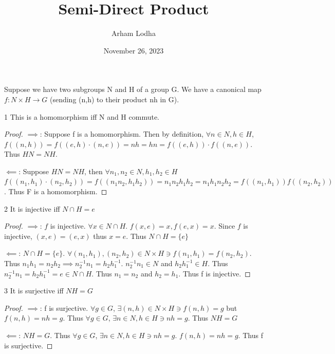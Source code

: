 \documentclass{article}
\begin{document}
\title{Semi-Direct Product}
\author{Arham Lodha}%
\date{November 26, 2023}%
\maketitle


Suppose we have two subgroups N and H of a group G. We have a canonical map $f: N \times H \to G$ (sending (n,h) to their product nh in G). 

\begin{PROB}{1}\label{Problem 1.}
    This is a homomorphism iff N and H commute. 
\end{PROB}
\begin{proof}
    $\implies$: Suppose f is a homomorphism. Then by definition, $\forall n \in N, h \in H$, $f((n, h)) = f((e, h) \cdot (n, e)) = nh = hn = f((e, h)) \cdot f((n, e))$. Thus $HN = NH$.

    $\impliedby$: Suppose $HN = NH$, then $\forall n_1, n_2 \in N, h_1, h_2 \in H$ $f((n_1, h_1) \cdot (n_2, h_2)) = f((n_1n_2, h_1h_2)) = n_1n_2h_1h_2 = n_1h_1n_2h_2 = f((n_1, h_1))f((n_2, h_2))$. Thus F is a homomorphism.
\end{proof}

\bigskip

\begin{PROB}{2}\label{Problem 2.}
    It is injective iff $N \cap H = {e}$
\end{PROB}
\begin{proof}
    $\implies$: $f$ is injective. $\forall x \in N \cap H$. $f(x, e) = x, f(e, x) = x$. Since $f$ is injective, $(x, e) = (e, x)$ thus $x = e$. Thus $N \cap H = \{e\}$

    $\impliedby$: $N \cap H = \{e\}$. $\forall (n_1, h_1), (n_2, h_2) \in N \times H \ni f(n_1, h_1) = f(n_2, h_2)$. Thus $n_1h_1 = n_2h_2 \implies n_2^{-1}n_1 = h_2h_1^{-1}$. $n_2^{-1}n_1 \in N$ and $h_2h_1^{-1} \in H$. Thus $n_2^{-1}n_1 = h_2h_1^{-1} = e \in N \cap H$. Thus $n_1 = n_2$ and $h_2 = h_1$. Thus f is injective.
\end{proof}

\bigskip

\begin{PROB}{3}\label{Problem 3.}
    It is surjective iff $NH = G$
\end{PROB}
\begin{proof}
    $\implies$: f is surjective. $\forall g \in G$, $\exists (n, h) \in N \times H \ni f(n, h) = g$ but $f(n, h) = nh = g$. Thus $\forall g \in G$, $\exists n \in N, h \in H \ni nh = g$. Thus $NH = G$

    $\impliedby$: $NH = G$. Thus $\forall g \in G$, $\exists n \in N, h \in H \ni nh = g$. $f(n, h) = nh = g$. Thus f is surjective.
\end{proof}
\end{document}
